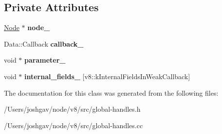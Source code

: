 \subsection*{Private Attributes}
\begin{DoxyCompactItemize}
\item 
\hyperlink{classv8_1_1internal_1_1_global_handles_1_1_node}{Node} $\ast$ {\bfseries node\+\_\+}\hypertarget{classv8_1_1internal_1_1_global_handles_1_1_pending_phantom_callback_a2a493c833579f76eba0b1ff50068420f}{}\label{classv8_1_1internal_1_1_global_handles_1_1_pending_phantom_callback_a2a493c833579f76eba0b1ff50068420f}

\item 
Data\+::\+Callback {\bfseries callback\+\_\+}\hypertarget{classv8_1_1internal_1_1_global_handles_1_1_pending_phantom_callback_ade4765a08408c9380d4eb7cd6c682879}{}\label{classv8_1_1internal_1_1_global_handles_1_1_pending_phantom_callback_ade4765a08408c9380d4eb7cd6c682879}

\item 
void $\ast$ {\bfseries parameter\+\_\+}\hypertarget{classv8_1_1internal_1_1_global_handles_1_1_pending_phantom_callback_a5c31766c7cad1717652e90de9aabc3b1}{}\label{classv8_1_1internal_1_1_global_handles_1_1_pending_phantom_callback_a5c31766c7cad1717652e90de9aabc3b1}

\item 
void $\ast$ {\bfseries internal\+\_\+fields\+\_\+} \mbox{[}v8\+::k\+Internal\+Fields\+In\+Weak\+Callback\mbox{]}\hypertarget{classv8_1_1internal_1_1_global_handles_1_1_pending_phantom_callback_adcd7f09dd88990f29aa54fd13b2d6704}{}\label{classv8_1_1internal_1_1_global_handles_1_1_pending_phantom_callback_adcd7f09dd88990f29aa54fd13b2d6704}

\end{DoxyCompactItemize}


The documentation for this class was generated from the following files\+:\begin{DoxyCompactItemize}
\item 
/\+Users/joshgav/node/v8/src/global-\/handles.\+h\item 
/\+Users/joshgav/node/v8/src/global-\/handles.\+cc\end{DoxyCompactItemize}
